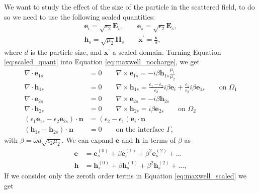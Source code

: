  We want to study the effect of the size of the particle in the scattered field, to do so we need 
 to use the following scaled quantities:
 \begin{align}\label{eq:scaled_quant}
 \mathbf{e}_i = \sqrt{\epsilon_2}\mathbf{E}_i, \qquad \mathbf{e}_s = \sqrt{\epsilon_2}\mathbf{E}_s, \nonumber \\
 \mathbf{h}_s = \sqrt{\mu_2}\mathbf{H}_s \qquad \mathbf{x}^\prime = \frac{\mathbf{x}}{d},
 \end{align}
 where $d$ is the particle size, and $\mathbf{x}^\prime$ a scaled domain. Turning
 Equation \eqref{eq:scaled_quant} into Equation \eqref{eq:maxwell_nocharge}, we get
 \begin{align} \label{eq:maxwell_scaled}
 \nabla \cdot \mathbf{e}_{1s} &= 0 \qquad \nabla \times \mathbf{e}_{1s} = -i\beta\mathbf{h}_{1s}\frac{\mu_1}{\mu_2} \nonumber \\
 \nabla \cdot \mathbf{h}_{1s} &= 0 \qquad \nabla \times \mathbf{h}_{1s} = \frac{\epsilon_1-\epsilon_2}{\epsilon_2}i\beta\mathbf{e}_{i}+\frac{\epsilon_1}{\epsilon_2}i\beta\mathbf{e}_{1s}  \qquad \text{on $\Omega_1$} \nonumber \\
 \nabla \cdot \mathbf{e}_{2s} &= 0 \qquad \nabla \times \mathbf{e}_{2s} = -i\beta\mathbf{h}_{2s} \nonumber \\
 \nabla \cdot \mathbf{h}_{2s} &= 0 \qquad \nabla \times \mathbf{h}_{2s} = i\beta\mathbf{e}_{2s} \qquad \text{on $\Omega_2$} \nonumber \\
 (\epsilon_1\mathbf{e}_{1s} - \epsilon_2\mathbf{e}_{2s})\cdot\mathbf{n} &= (\epsilon_2-\epsilon_1)\mathbf{e}_i\cdot \mathbf{n} \nonumber \\(\mathbf{h}_{1s} - \mathbf{h}_{2s})\cdot \mathbf{n}&=0 \qquad \text{on the interface $\Gamma$,}
 \end{align}
 with $\beta=\omega d \sqrt{\epsilon_2\mu_2}$. We can expand $\mathbf{e}$ and $\mathbf{h}$ in 
 terms of $\beta$ as
 \begin{align} \label{eq:expand}
 \mathbf{e} &= \mathbf{e}_s^{(0)} + \beta \mathbf{e}_s^{(1)} + \beta^2 \mathbf{e}_s^{(2)} + \ldots \nonumber\\
 \mathbf{h} &= \mathbf{h}_s^{(0)} + \beta \mathbf{h}_s^{(1)} + \beta^2 \mathbf{h}_s^{(2)} + \ldots,
 \end{align}
 If we consider only the zeroth order terms in Equation \eqref{eq:maxwell_scaled} we get
